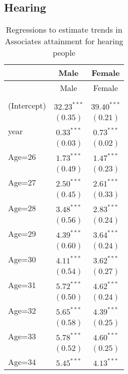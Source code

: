 \documentclass[fullpage]{paper}
\begin{document}
\subsection{ Hearing }

\begin{center}
\begin{longtable}{l c c }
\hline
 & Male & Female \\
\hline
\endfirsthead
\hline
 & Male & Female \\
\hline
\endhead
\hline
\endfoot
\hline
\multicolumn{3}{l}{\scriptsize{$^{***}p<0.001$, $^{**}p<0.01$, $^*p<0.05$}}\\
\caption{Regressions to estimate trends in Associates attainment for hearing people}
\label{table:coefficients}
\endlastfoot
(Intercept) & $32.23^{***}$ & $39.40^{***}$ \\
            & $(0.35)$      & $(0.21)$      \\
year        & $0.33^{***}$  & $0.73^{***}$  \\
            & $(0.03)$      & $(0.02)$      \\
Age=26      & $1.73^{***}$  & $1.47^{***}$  \\
            & $(0.49)$      & $(0.23)$      \\
Age=27      & $2.50^{***}$  & $2.61^{***}$  \\
            & $(0.45)$      & $(0.33)$      \\
Age=28      & $3.48^{***}$  & $2.83^{***}$  \\
            & $(0.56)$      & $(0.24)$      \\
Age=29      & $4.39^{***}$  & $3.64^{***}$  \\
            & $(0.60)$      & $(0.24)$      \\
Age=30      & $4.11^{***}$  & $3.62^{***}$  \\
            & $(0.54)$      & $(0.27)$      \\
Age=31      & $5.72^{***}$  & $4.62^{***}$  \\
            & $(0.50)$      & $(0.24)$      \\
Age=32      & $5.65^{***}$  & $4.39^{***}$  \\
            & $(0.58)$      & $(0.25)$      \\
Age=33      & $5.78^{***}$  & $4.60^{***}$  \\
            & $(0.52)$      & $(0.25)$      \\
Age=34      & $5.45^{***}$  & $4.13^{***}$  \\

\end{longtable}
\end{center}
\end{document}
